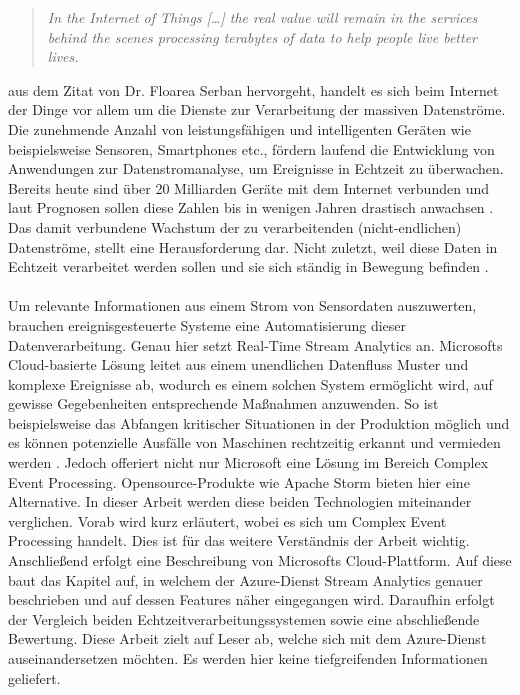 
\begin{quote} \textit{\glqq In the Internet of Things […] the real value will remain in the services behind the scenes processing terabytes of data to help people live better lives. \grqq~}\cite{Floarea.2014}\\ \end{quote} 

 aus dem Zitat von Dr. Floarea Serban hervorgeht, handelt es sich beim Internet der Dinge vor allem um die Dienste zur Verarbeitung der massiven Datenströme. Die zunehmende Anzahl von leistungsfähigen und intelligenten Geräten wie beispielsweise Sensoren, Smartphones etc., fördern laufend die Entwicklung von Anwendungen zur Datenstromanalyse, um Ereignisse in Echtzeit zu überwachen. Bereits heute sind über 20 Milliarden Geräte mit dem Internet verbunden und laut Prognosen sollen diese Zahlen bis in wenigen Jahren drastisch anwachsen \cite{Statista.2017}. Das damit verbundene Wachstum der zu verarbeitenden (nicht-endlichen) Datenströme, stellt eine Herausforderung dar. Nicht zuletzt, weil diese Daten in Echtzeit verarbeitet werden sollen und sie sich ständig in Bewegung befinden \cite{Prosise.}.\\ \\  
Um relevante Informationen aus einem Strom von Sensordaten auszuwerten, brauchen ereignisgesteuerte Systeme eine Automatisierung dieser Datenverarbeitung. Genau hier setzt Real-Time Stream Analytics an. Microsofts Cloud-basierte Lösung leitet aus einem unendlichen Datenfluss Muster und komplexe Ereignisse ab, wodurch es einem solchen System ermöglicht wird, auf gewisse Gegebenheiten entsprechende Maßnahmen anzuwenden. So ist beispielsweise das Abfangen kritischer Situationen in der Produktion möglich und es können potenzielle Ausfälle von Maschinen rechtzeitig erkannt und vermieden werden \cite{rcrwireless.2016}. Jedoch offeriert nicht nur Microsoft eine Lösung im Bereich Complex Event Processing. Opensource-Produkte wie Apache Storm bieten hier eine Alternative. In dieser Arbeit werden diese beiden Technologien miteinander verglichen. Vorab wird kurz erläutert, wobei es sich um Complex Event Processing handelt. Dies ist für das weitere Verständnis der Arbeit wichtig. Anschließend erfolgt eine Beschreibung von Microsofts Cloud-Plattform. Auf diese baut das Kapitel auf, in welchem der Azure-Dienst Stream Analytics genauer beschrieben und auf dessen Features näher eingegangen wird. Daraufhin erfolgt der Vergleich beiden Echtzeitverarbeitungssystemen sowie eine abschließende Bewertung. Diese Arbeit zielt auf Leser ab, welche sich mit dem Azure-Dienst auseinandersetzen möchten. Es werden hier keine tiefgreifenden Informationen geliefert.\\ \\
